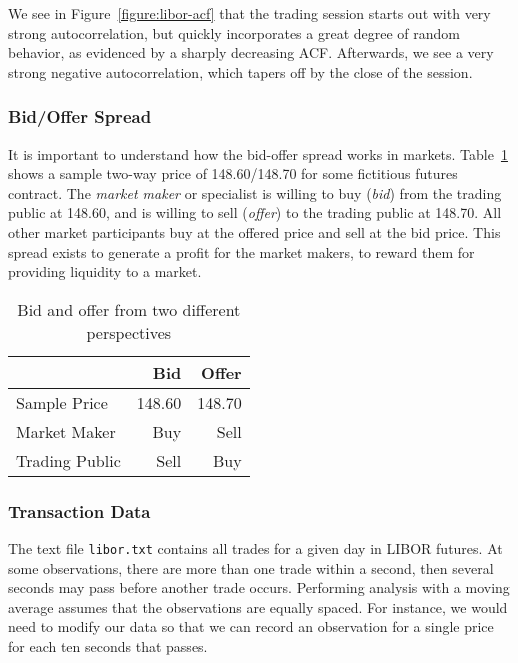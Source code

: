 We see in Figure~\ref{figure:libor-acf} that the trading session starts out with very strong autocorrelation, but quickly incorporates a great degree of random behavior, as evidenced by a sharply decreasing ACF. Afterwards, we see a very strong negative autocorrelation, which tapers off by the close of the session.

\subsubsection{Bid/Offer Spread}
It is important to understand how the bid-offer spread works in markets. Table~\ref{tab:bid-offer} shows a sample two-way price of 148.60/148.70 for some fictitious futures contract. The \emph{market maker} or specialist is willing to buy (\textit{bid}) from the trading public at 148.60, and is willing to sell (\textit{offer}) to the trading public at 148.70. All other market participants buy at the offered price and sell at the bid price. This spread exists to generate a profit for the market makers, to reward them for providing liquidity to a market.

\begin{table}[bp]
	\centering
	\begin{tabular}{lrr}
	\toprule
	& Bid	& Offer \\
	\hline
	Sample Price  & 148.60 & 148.70 \\
	Market Maker  &	Buy	  & Sell    \\ 
	Trading Public &	Sell  & Buy     \\
	\bottomrule
	\end{tabular}
   \caption{Bid and offer from two different perspectives}
   \label{tab:bid-offer}
\end{table}

\subsubsection{Transaction Data}
The text file \texttt{libor.txt} contains all trades for a given day in LIBOR futures. At some observations, there are more than one trade within a second, then several seconds may pass before another trade occurs. Performing analysis with a moving average assumes that the observations are equally spaced. For instance, we would need to modify our data so that we can record an observation for a single price for each ten seconds that passes.

